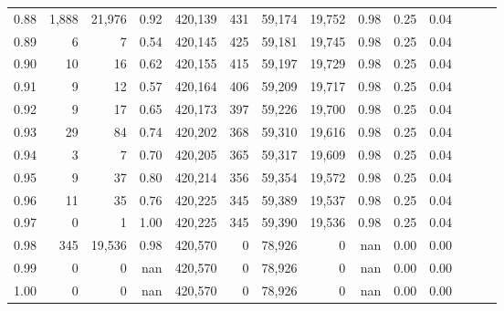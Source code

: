 \begin{tabular}{rrrrrrrrrrrrrr}
0.88 &   1,888 &  21,976 &  0.92 &  420,139 &      431 &  59,174 &  19,752 &  0.98 &  0.25 &      0.04 \\
0.89 &       6 &       7 &  0.54 &  420,145 &      425 &  59,181 &  19,745 &  0.98 &  0.25 &      0.04 \\
0.90 &      10 &      16 &  0.62 &  420,155 &      415 &  59,197 &  19,729 &  0.98 &  0.25 &      0.04 \\
0.91 &       9 &      12 &  0.57 &  420,164 &      406 &  59,209 &  19,717 &  0.98 &  0.25 &      0.04 \\
0.92 &       9 &      17 &  0.65 &  420,173 &      397 &  59,226 &  19,700 &  0.98 &  0.25 &      0.04 \\
0.93 &      29 &      84 &  0.74 &  420,202 &      368 &  59,310 &  19,616 &  0.98 &  0.25 &      0.04 \\
0.94 &       3 &       7 &  0.70 &  420,205 &      365 &  59,317 &  19,609 &  0.98 &  0.25 &      0.04 \\
0.95 &       9 &      37 &  0.80 &  420,214 &      356 &  59,354 &  19,572 &  0.98 &  0.25 &      0.04 \\
0.96 &      11 &      35 &  0.76 &  420,225 &      345 &  59,389 &  19,537 &  0.98 &  0.25 &      0.04 \\
0.97 &       0 &       1 &  1.00 &  420,225 &      345 &  59,390 &  19,536 &  0.98 &  0.25 &      0.04 \\
0.98 &     345 &  19,536 &  0.98 &  420,570 &        0 &  78,926 &       0 &   nan &  0.00 &      0.00 \\
0.99 &       0 &       0 &   nan &  420,570 &        0 &  78,926 &       0 &   nan &  0.00 &      0.00 \\
1.00 &       0 &       0 &   nan &  420,570 &        0 &  78,926 &       0 &   nan &  0.00 &      0.00 \\
\bottomrule
\end{tabular}
